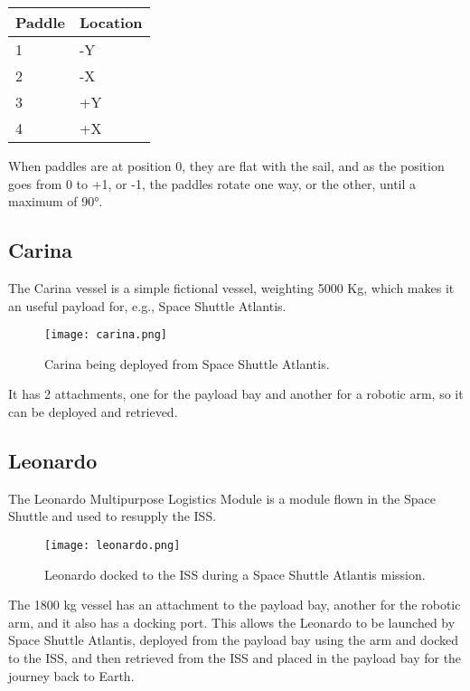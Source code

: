 \documentclass[Orbiter User Manual.tex]{subfiles}
\begin{document}
	\begin{longtable}{ |p{}|p{}| }
	\hline\rule{0pt}{2ex}
	\textbf{Paddle} & \textbf{Location}\\
	\hline\rule{0pt}{2ex}
	1 & -Y\\
	\hline\rule{0pt}{2ex}
	2 & -X\\
	\hline\rule{0pt}{2ex}
	3 & +Y\\
	\hline\rule{0pt}{2ex}
	4 & +X\\
	\hline
	\end{longtable}

\noindent
When paddles are at position 0, they are flat with the sail, and as the position goes from 0 to +1, or -1, the paddles rotate one way, or the other, until a maximum of 90°.


\subsection{Carina}
The Carina vessel is a simple fictional vessel, weighting 5000 Kg, which makes it an useful payload for, e.g., Space Shuttle Atlantis.

\begin{figure}[H]
  \centering
  \texttt{[image: carina.png]}
  \caption{Carina being deployed from Space Shuttle Atlantis.}
\end{figure}

\noindent
It has 2 attachments, one for the payload bay and another for a robotic arm, so it can be deployed and retrieved.


\subsection{Leonardo}
The Leonardo Multipurpose Logistics Module is a module flown in the Space Shuttle and used to resupply the ISS.

\begin{figure}[H]
  \centering
  \texttt{[image: leonardo.png]}
  \caption{Leonardo docked to the ISS during a Space Shuttle Atlantis mission.}
\end{figure}

\noindent
The 1800 kg vessel has an attachment to the payload bay, another for the robotic arm, and it also has a docking port. This allows the Leonardo to be launched by Space Shuttle Atlantis, deployed from the payload bay using the arm and docked to the ISS, and then retrieved from the ISS and placed in the payload bay for the journey back to Earth.
\end{document}
